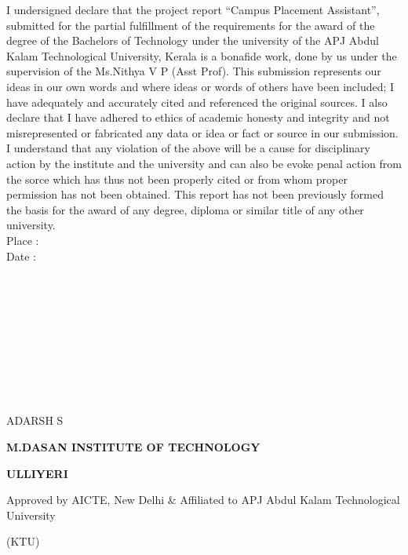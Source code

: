 \documentclass[12pt]{article}
\begin{document}
\begin{changemargin}{0.5cm}{0.5cm}
I undersigned declare that the project report “Campus Placement Assistant”, submitted for the partial fulfillment of the requirements for
the award of the degree of the Bachelors of Technology under the university of
the APJ Abdul Kalam Technological University, Kerala is a bonafide work,
done by us under the supervision of the Ms.Nithya V P (Asst Prof). This
submission represents our ideas in our own words and where ideas or words
of others have been included; I have adequately and accurately cited and
referenced the original sources. I also declare that I have adhered to ethics
of academic honesty and integrity and not misrepresented or fabricated any
data or idea or fact or source in our submission. I understand that any
violation of the above will be a cause for disciplinary action by the
institute and the university and can also be evoke penal action from the sorce
which has thus not been properly cited or from whom proper permission has
not been obtained. This report has not been previously formed the basis for
the award of any degree, diploma or similar title of any other university.
\\Place :
\\Date :
\\
\\
\\
\\
\\
\\
\\
\\
\\
\\
 \begin{center}{ADARSH S}\end{center}

\thispagestyle{empty}

\newpage
\vspace*{1px}
\begin{center}\large\bf{M.DASAN INSTITUTE OF TECHNOLOGY}\end{center}
\begin{center}\large\bf{ULLIYERI} \end{center}
\begin{center}Approved by AICTE, New Delhi \& Affiliated to APJ Abdul Kalam Technological University\end{center}
\begin{center}(KTU)\end{center}


\end{changemargin}
\end{document}
